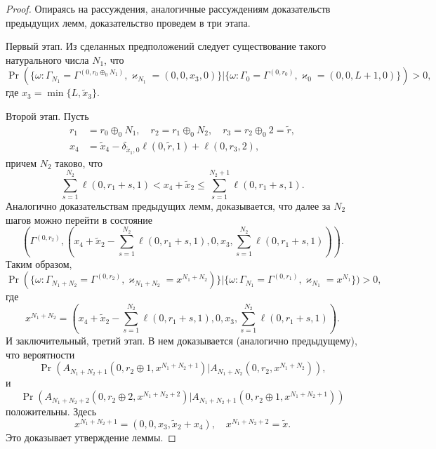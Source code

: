 \documentclass{report}
\begin{document}
\begin{proof}
Опираясь на рассуждения, аналогичные рассуждениям доказательств предыдущих лемм, доказательство проведем в три этапа.

Первый этап. Из сделанных предположений следует существование такого натурального числа $N_1$, что 
\begin{equation*}
\Pr(\{\omega\colon \Gamma_{N_1}=\Gamma^{(0,r_0\oplus_0 N_1)}, \varkappa_{N_1}=(0,0,x_3,0)\}|\{\omega\colon 
\Gamma_{0}=\Gamma^{(0,r_0)}, \varkappa_{0}=(0,0,L+1,0)\})>0,
\end{equation*}
где $x_3=\min\{L,\tilde{x}_3\}$.

Второй этап. Пусть
\begin{align*}
r_1&=r_0\oplus_0 N_1, \quad r_2=r_1\oplus_0 N_2, \quad r_3=r_2\oplus_0 2 = \tilde{r},\\
x_4&=\tilde{x}_4 - \delta_{\tilde{x}_1,0}\ell(0,\tilde{r},1) + \ell(0,r_3,2),
\end{align*}
причем $N_2$ таково, что 
\begin{equation*}
\sum_{s=1}^{N_2} \ell(0,r_1+s,1) < x_4 + \tilde{x}_2 \leqslant \sum_{s=1}^{N_2+1} \ell(0,r_1+s,1).
\end{equation*}
Аналогично доказательствам предыдущих лемм, доказывается, что далее за $N_2$ шагов можно перейти в состояние 
\begin{equation*}
(\Gamma^{(0,r_2)}, (x_4 + \tilde{x}_2 - \sum_{s=1}^{N_2} \ell(0,r_1+s,1),0,x_3,\sum_{s=1}^{N_2} \ell(0,r_1+s,1))).
\end{equation*}
Таким образом,
\begin{equation*}
\Pr(\{\omega\colon \Gamma_{N_1+N_2}=\Gamma^{(0,r_2)}, \varkappa_{N_1+N_2}=x^{N_1+N_2 })\}|\{\omega\colon 
\Gamma_{N_1}=\Gamma^{(0,r_1)}, \varkappa_{N_1}=x^{N_1}\})>0,
\end{equation*}
где 
\begin{equation*}
x^{N_1+N_2} = (x_4 + \tilde{x}_2 - \sum_{s=1}^{N_2} \ell(0,r_1+s,1),0,x_3,\sum_{s=1}^{N_2} \ell(0,r_1+s,1)).
\end{equation*}
И заключительный, третий этап. В нем доказывается (аналогично предыдущему), что вероятности
\begin{equation*}
\Pr(A_{N_1+N_2+1}(0,r_2\oplus 1,x^{N_1+N_2+1})|A_{N_1+N_2}(0,r_2,x^{N_1+N_2}) ),
\end{equation*}
и 
\begin{equation*}
\Pr(A_{N_1+N_2+2}(0,r_2\oplus 2,x^{N_1+N_2+2})|A_{N_1+N_2+1}(0,r_2\oplus 1,x^{N_1+N_2+1}) )
\end{equation*}
положительны.  Здесь 
\begin{equation*}
x^{N_1+N_2 + 1} = (0,0,x_3,\tilde{x}_2+x_4), \quad x^{N_1+N_2 + 2} = \tilde{x}.
\end{equation*}
Это доказывает утверждение леммы.
\end{proof}
\end{document}
